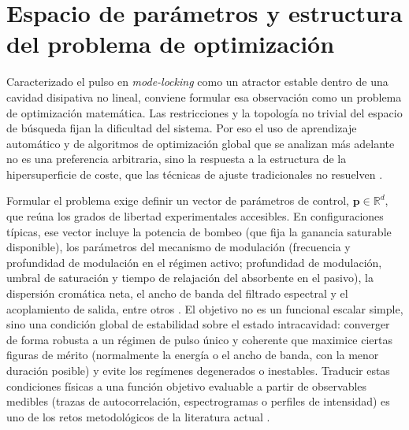 \section{Espacio de parámetros y estructura del problema de optimización}
\label{sec:espacio-parametros}

Caracterizado el pulso en \emph{mode-locking} como un atractor estable dentro de una cavidad disipativa no lineal, conviene formular esa observación como un problema de optimización matemática. Las restricciones y la topología no trivial del espacio de búsqueda fijan la dificultad del sistema. Por eso el uso de aprendizaje automático y de algoritmos de optimización global que se analizan más adelante no es una preferencia arbitraria, sino la respuesta a la estructura de la hipersuperficie de coste, que las técnicas de ajuste tradicionales no resuelven \cite{Genty2021}.

Formular el problema exige definir un vector de parámetros de control, $\mathbf{p} \in \mathbb{R}^d$, que reúna los grados de libertad experimentales accesibles. En configuraciones típicas, ese vector incluye la potencia de bombeo (que fija la ganancia saturable disponible), los parámetros del mecanismo de modulación (frecuencia y profundidad de modulación en el régimen activo; profundidad de modulación, umbral de saturación y tiempo de relajación del absorbente en el pasivo), la dispersión cromática neta, el ancho de banda del filtrado espectral y el acoplamiento de salida, entre otros \cite{Haus2000,Keller2022}. El objetivo no es un funcional escalar simple, sino una condición global de estabilidad sobre el estado intracavidad: converger de forma robusta a un régimen de pulso único y coherente que maximice ciertas figuras de mérito (normalmente la energía o el ancho de banda, con la menor duración posible) y evite los regímenes degenerados o inestables. Traducir estas condiciones físicas a una función objetivo evaluable a partir de observables medibles (trazas de autocorrelación, espectrogramas o perfiles de intensidad) es uno de los retos metodológicos de la literatura actual \cite{Genty2021}.

